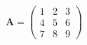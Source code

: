 \begin{equation*}
	\bm{A} =
	\begin{pmatrix}
		1 & 2 & 3 \\
		4 & 5 & 6 \\
		7 & 8 & 9
	\end{pmatrix}
\end{equation*}
